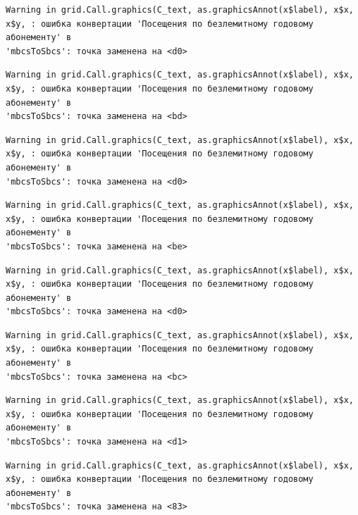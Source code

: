 \documentclass[
  letterpaper,
  DIV=11,
  numbers=noendperiod]{scrreprt}
\begin{document}
\begin{verbatim}
Warning in grid.Call.graphics(C_text, as.graphicsAnnot(x$label), x$x,
x$y, : ошибка конвертации 'Посещения по безлемитному годовому абонементу' в
'mbcsToSbcs': точка заменена на <d0>
\end{verbatim}

\begin{verbatim}
Warning in grid.Call.graphics(C_text, as.graphicsAnnot(x$label), x$x,
x$y, : ошибка конвертации 'Посещения по безлемитному годовому абонементу' в
'mbcsToSbcs': точка заменена на <bd>
\end{verbatim}

\begin{verbatim}
Warning in grid.Call.graphics(C_text, as.graphicsAnnot(x$label), x$x,
x$y, : ошибка конвертации 'Посещения по безлемитному годовому абонементу' в
'mbcsToSbcs': точка заменена на <d0>
\end{verbatim}

\begin{verbatim}
Warning in grid.Call.graphics(C_text, as.graphicsAnnot(x$label), x$x,
x$y, : ошибка конвертации 'Посещения по безлемитному годовому абонементу' в
'mbcsToSbcs': точка заменена на <be>
\end{verbatim}

\begin{verbatim}
Warning in grid.Call.graphics(C_text, as.graphicsAnnot(x$label), x$x,
x$y, : ошибка конвертации 'Посещения по безлемитному годовому абонементу' в
'mbcsToSbcs': точка заменена на <d0>
\end{verbatim}

\begin{verbatim}
Warning in grid.Call.graphics(C_text, as.graphicsAnnot(x$label), x$x,
x$y, : ошибка конвертации 'Посещения по безлемитному годовому абонементу' в
'mbcsToSbcs': точка заменена на <bc>
\end{verbatim}

\begin{verbatim}
Warning in grid.Call.graphics(C_text, as.graphicsAnnot(x$label), x$x,
x$y, : ошибка конвертации 'Посещения по безлемитному годовому абонементу' в
'mbcsToSbcs': точка заменена на <d1>
\end{verbatim}

\begin{verbatim}
Warning in grid.Call.graphics(C_text, as.graphicsAnnot(x$label), x$x,
x$y, : ошибка конвертации 'Посещения по безлемитному годовому абонементу' в
'mbcsToSbcs': точка заменена на <83>
\end{verbatim}
\end{document}

